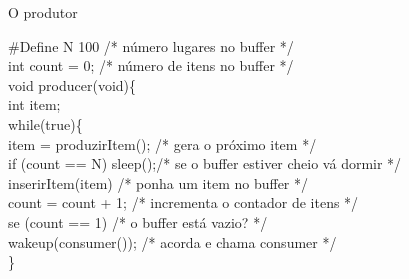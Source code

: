 \documentclass[11pt]{beamer}
\begin{document}
\begin{frame}{ O produtor}
  \begin{algorithm}[H]
    \#Define N 100	/* número lugares no buffer */ \\
\hspace{0,2 cm}    int count = 0;	/* número de itens no buffer */ \\
\vspace{0,3 cm}    
    void producer(void)\{ \\
\hspace{0,2 cm}      int item;\\
      
\hspace{0,2 cm}      while(true)\{\\
\hspace{0,5 cm}	item = produzirItem(); /* gera o próximo item */\\ 
\hspace{0,5 cm}	if (count == N) sleep();/* se o buffer estiver cheio vá dormir */\\
\hspace{0,7 cm}	  inserirItem(item)	/* ponha um item no buffer */\\
\hspace{0,5 cm}	count = count + 1;       /* incrementa o contador de itens */\\
\hspace{0,5 cm}	se (count == 1) 	 /* o buffer está vazio? */\\
\hspace{0,7 cm}	  wakeup(consumer());	 /* acorda e chama consumer */\\
\hspace{0,2 cm}    \}\\
  \end{algorithm}
\end{frame}

\end{document}
